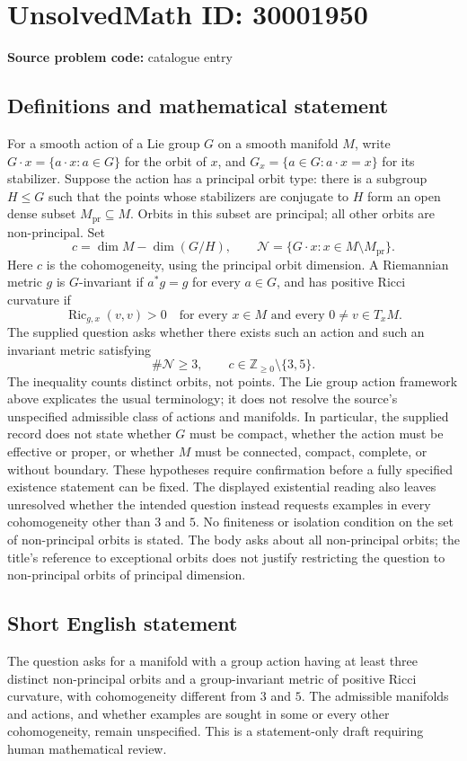 \documentclass[11pt]{article}
\begin{document}
\section*{UnsolvedMath ID: 30001950}
\textbf{Source problem code:} catalogue entry
\subsection{Definitions and mathematical statement}
For a smooth action of a Lie group \(G\) on a smooth manifold \(M\), write \(G\cdot x=\{a\cdot x:a\in G\}\) for the orbit of \(x\), and \(G_x=\{a\in G:a\cdot x=x\}\) for its stabilizer. Suppose the action has a principal orbit type: there is a subgroup \(H\leq G\) such that the points whose stabilizers are conjugate to \(H\) form an open dense subset \(M_{\mathrm{pr}}\subseteq M\). Orbits in this subset are principal; all other orbits are non-principal. Set
\[
 c=\dim M-\dim(G/H),\qquad
 \mathcal N=\{G\cdot x:x\in M\setminus M_{\mathrm{pr}}\}.
\]
Here \(c\) is the cohomogeneity, using the principal orbit dimension. A Riemannian metric \(g\) is \(G\)-invariant if \(a^*g=g\) for every \(a\in G\), and has positive Ricci curvature if
\[
 \operatorname{Ric}_{g,x}(v,v)>0
 \quad\text{for every }x\in M\text{ and every }0\ne v\in T_xM.
\]
The supplied question asks whether there exists such an action and such an invariant metric satisfying
\[
 \#\mathcal N\geq 3,
 \qquad c\in\mathbb Z_{\geq0}\setminus\{3,5\}.
\]
The inequality counts distinct orbits, not points. The Lie group action framework above explicates the usual terminology; it does not resolve the source's unspecified admissible class of actions and manifolds. In particular, the supplied record does not state whether \(G\) must be compact, whether the action must be effective or proper, or whether \(M\) must be connected, compact, complete, or without boundary. These hypotheses require confirmation before a fully specified existence statement can be fixed. The displayed existential reading also leaves unresolved whether the intended question instead requests examples in every cohomogeneity other than \(3\) and \(5\). No finiteness or isolation condition on the set of non-principal orbits is stated. The body asks about all non-principal orbits; the title's reference to exceptional orbits does not justify restricting the question to non-principal orbits of principal dimension.
\subsection{Short English statement}
The question asks for a manifold with a group action having at least three distinct non-principal orbits and a group-invariant metric of positive Ricci curvature, with cohomogeneity different from \(3\) and \(5\). The admissible manifolds and actions, and whether examples are sought in some or every other cohomogeneity, remain unspecified. This is a statement-only draft requiring human mathematical review.
\end{document}
